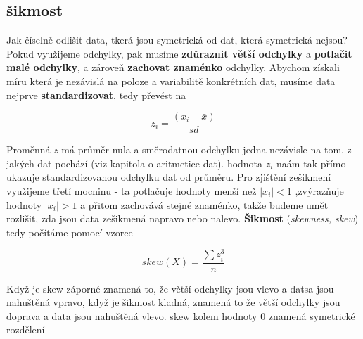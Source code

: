 \documentclass[
  czech,
  11pt,
  letterpaper,
  DIV=11,
  numbers=noendperiod]{scrreprt}
\begin{document}
\subsection{šikmost}\label{ux161ikmost}

Jak číselně odlišit data, tkerá jsou symetrická od dat, která symetrická
nejsou? Pokud využijeme odchylky, pak musíme \textbf{zdůraznit větší
odchylky} a \textbf{potlačit malé odchylky}, a zároveň \textbf{zachovat
znaménko} odchylky. Abychom získali míru která je nezávislá na poloze a
variabilitě konkrétních dat, musíme data nejprve
\textbf{standardizovat}, tedy převést na

\[z_i=\frac{(x_i-\bar{x})}{sd}\]

Proměnná \(z\) má průměr nula a směrodatnou odchylku jedna nezávisle na
tom, z jakých dat pochází (viz kapitola o aritmetice dat). hodnota
\(z_i\) naám tak přímo ukazuje standardizovanou odchylku dat od průměru.
Pro zjištění zešikmení využijeme třetí mocninu - ta potlačuje hodnoty
menší než \(|x_i|<1\) ,zvýrazňuje hodnoty \(|x_i|>1\) a přitom zachovává
stejné znaménko, takže budeme umět rozlišit, zda jsou data zešikmená
napravo nebo nalevo. \textbf{Šikmost} (\emph{skewness, skew}) tedy
počítáme pomocí vzorce

\[ 
  skew(X)=\frac{\sum z_i^3}{n}
\]

Když je skew záporné znamená to, že větší odchylky jsou vlevo a datsa
jsou nahuštěná vpravo, když je šikmost kladná, znamená to že větší
odchylky jsou doprava a data jsou nahuštěná vlevo. skew kolem hodnoty 0
znamená symetrické rozdělení
\end{document}
